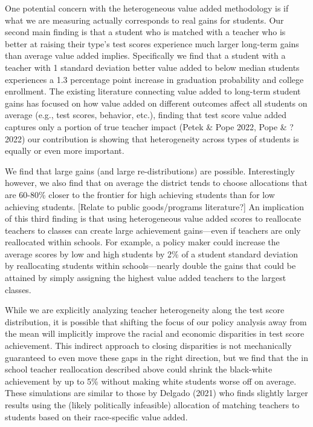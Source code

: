 \documentclass{article}
\theoremstyle{definition}
\theoremstyle{definition}
\theoremstyle{definition}
\begin{document}
One potential concern with the heterogeneous value added methodology is if what we are measuring actually corresponds to real gains for students. Our second main finding is that a student who is matched with a teacher who is better at raising their type’s test scores experience much larger long-term gains than average value added implies. Specifically we find that a student with a teacher with 1 standard deviation better value added to below median students experiences a 1.3 percentage point increase in graduation probability and college enrollment. The existing literature connecting value added to long-term student gains has focused on how value added on different outcomes affect all students on average (e.g., test scores, behavior, etc.), finding that test score value added captures only a portion of true teacher impact (Petek & Pope 2022, Pope & ? 2022) our contribution is showing that heterogeneity across types of students is equally or even more important.


We find that large gains (and large re-distributions) are possible. Interestingly however, we also find that on average the district tends to choose allocations that are 60-80\% closer to the frontier for high achieving students than for low achieving students. [Relate to public goods/programs literature?] An implication of this third finding is that using heterogeneous value added scores to reallocate teachers to classes can create large achievement gains—even if teachers are only reallocated within schools. For example, a policy maker could increase the average scores by low and high students by 2\% of a student standard deviation by reallocating students within schools—nearly double the gains that could be attained by simply assigning the highest value added teachers to the largest classes. 

While we are explicitly analyzing teacher heterogeneity along the test score distribution, it is possible that shifting the focus of our policy analysis away from the mean will implicitly improve the racial and economic disparities in test score achievement. This indirect approach to closing disparities is not mechanically guaranteed to even move these gaps in the right direction, but we find that the in school teacher reallocation described above could shrink the black-white achievement by up to 5\% without making white students worse off on average. These simulations are similar to those by Delgado (2021) who finds slightly larger results using the (likely politically infeasible) allocation of matching teachers to students based on their race-specific value added.
\end{document}
